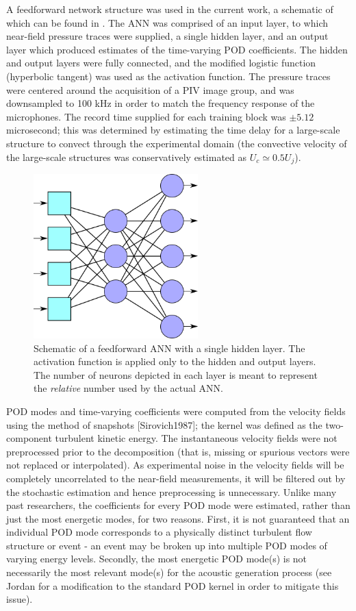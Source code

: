 A feedforward network structure was used in the current work, a schematic of which can be found in .
The ANN was comprised of an input layer, to which near-field pressure traces were supplied, a single hidden layer, and an output layer which produced estimates of the time-varying POD coefficients. 
The hidden and output layers were fully connected, and the modified logistic function (hyperbolic tangent) was used as the activation function.
The pressure traces were centered around the acquisition of a PIV image group, and was downsampled to 100 kHz in order to match the frequency response of the microphones.
The record time supplied for each training block was $\pm 5.12$ microsecond; this was determined by estimating the time delay for a large-scale structure to convect through the experimental domain (the convective velocity of the large-scale structures was conservatively estimated as $U_c \simeq 0.5 U_j$).
\begin{figure}
	\centering
	\includegraphics[width = 2.5in]{Figures/neural_net.png}
	\caption{Schematic of a feedforward ANN with a single hidden layer. The activation function is applied only to the hidden and output layers. The number of neurons depicted in each layer is meant to represent the \textit{relative} number used by the actual ANN.}
	\label{fig:ch4_neural_net}
\end{figure} 

POD modes and time-varying coefficients were computed from the velocity fields using the method of snapshots [Sirovich1987]; the kernel was defined as the two-component turbulent kinetic energy.
The instantaneous velocity fields were not preprocessed prior to the decomposition (that is, missing or spurious vectors were not replaced or interpolated).
As experimental noise in the velocity fields will be completely uncorrelated to the near-field measurements, it will be filtered out by the stochastic estimation and hence preprocessing is unnecessary.
Unlike many past researchers, the coefficients for every POD mode were estimated, rather than just the most energetic modes, for two reasons.
First, it is not guaranteed that an individual POD mode corresponds to a physically distinct turbulent flow structure or event - an event may be broken up into multiple POD modes of varying energy levels.
Secondly, the most energetic POD mode(s) is not necessarily the most relevant mode(s) for the acoustic generation process (see Jordan \etal [2007] for a modification to the standard POD kernel in order to mitigate this issue). 

